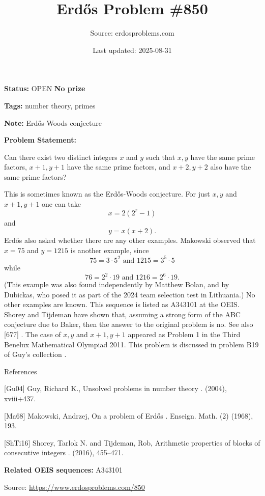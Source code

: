 \documentclass{article}
\title{Erd\H{o}s Problem \#850}
\date{Last updated: 2025-08-31}
\author{Source: erdosproblems.com}
\begin{document}
\maketitle

\noindent\textbf{Status:} OPEN \quad \textbf{No prize}

\noindent\textbf{Tags:} number theory, primes

\medskip
\noindent\textbf{Note:} Erdős-Woods conjecture

\medskip

\noindent\textbf{Problem Statement:}

Can there exist two distinct integers $x$ and $y$ such that $x,y$ have the same prime factors, $x+1,y+1$ have the same prime factors, and $x+2,y+2$ also have the same prime factors?




This is sometimes known as the Erd\H{o}s-Woods conjecture. For just $x,y$ and $x+1,y+1$ one can take\[x=2(2^r-1)\]and\[y = x(x+2).\]Erd\H{o}s also asked whether there are any other examples. Makowski \cite{Ma68} observed that $x=75$ and $y=1215$ is another example, since\[75 = 3\cdot 5^2 \textrm{ and }1215 = 3^5\cdot 5\]while\[76 = 2^2\cdot 19\textrm{ and }1216 = 2^6\cdot 19.\](This example was also found independently by Matthew Bolan, and by Dubickas, who posed it as part of the 2024 team selection test in Lithuania.) No other examples are known. This sequence is listed as A343101 at the OEIS. Shorey and Tijdeman \cite{ShTi16} have shown that, assuming a strong form of the ABC conjecture due to Baker, then the answer to the original problem is no. See also [677] . The case of $x,y$ and $x+1,y+1$ appeared as Problem 1 in the Third Benelux Mathematical Olympiad 2011. This problem is discussed in problem B19 of Guy's collection \cite{Gu04}.




References

[Gu04] Guy, Richard K., Unsolved problems in number theory . (2004), xviii+437.

[Ma68] Makowski, Andrzej, On a problem of {E}rd\H{o}s . Enseign. Math. (2) (1968), 193.

[ShTi16] Shorey, Tarlok N. and Tijdeman, Rob, Arithmetic properties of blocks of consecutive integers . (2016), 455--471.

\noindent\textbf{Related OEIS sequences:} A343101


\bigskip
\noindent\small{Source: \url{https://www.erdosproblems.com/850}}
\end{document}
